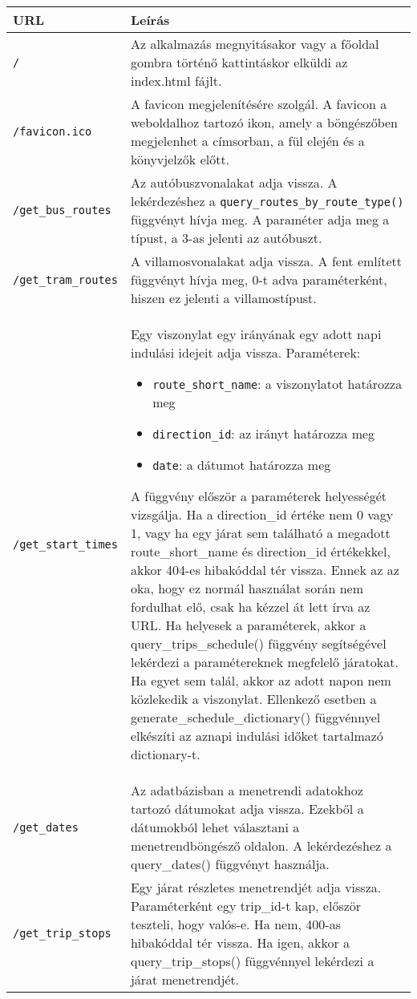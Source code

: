 \begin{longtable}{|p{4.5cm}|p{9cm}|}
\hline
\textbf{URL} & \textbf{Leírás} \\
\hline
\texttt{/} &
Az alkalmazás megnyitásakor vagy a főoldal gombra történő kattintáskor elküldi az index.html fájlt. \\
\hline
\texttt{/favicon.ico} &
A favicon megjelenítésére szolgál. A favicon a weboldalhoz tartozó ikon, amely a böngészőben megjelenhet a címsorban, a fül elején és a könyvjelzők előtt. \\
\hline
\texttt{/get\_bus\_routes} &
Az autóbuszvonalakat adja vissza. A lekérdezéshez a \texttt{query\_routes\_by\_route\_type()} függvényt hívja meg. A paraméter adja meg a típust, a 3-as jelenti az autóbuszt. \\
\hline
\texttt{/get\_tram\_routes} &
A villamosvonalakat adja vissza. A fent említett függvényt hívja meg, 0-t adva paraméterként, hiszen ez jelenti a villamostípust. \\
\hline
\texttt{/get\_start\_times} &
Egy viszonylat egy irányának egy adott napi indulási idejeit adja vissza.
Paraméterek:
\begin{itemize}
\item \texttt{route\_short\_name}: a viszonylatot határozza meg
\item \texttt{direction\_id}: az irányt határozza meg
\item \texttt{date}: a dátumot határozza meg
\end{itemize}
A függvény először a paraméterek helyességét vizsgálja. Ha a direction\_id értéke nem 0 vagy 1, vagy ha egy járat sem található a megadott route\_short\_name és direction\_id értékekkel, akkor 404-es hibakóddal tér vissza. Ennek az az oka, hogy ez normál használat során nem fordulhat elő, csak ha kézzel át lett írva az URL.
Ha helyesek a paraméterek, akkor a query\_trips\_schedule() függvény segítségével lekérdezi a paramétereknek megfelelő járatokat. Ha egyet sem talál, akkor az adott napon nem közlekedik a viszonylat. Ellenkező esetben a generate\_schedule\_dictionary()  függvénnyel elkészíti az aznapi indulási időket tartalmazó dictionary-t. \\
\hline
\texttt{/get\_dates} &
Az adatbázisban a menetrendi adatokhoz tartozó dátumokat adja vissza. Ezekből a dátumokból lehet választani a menetrendböngésző oldalon. A lekérdezéshez a query\_dates() függvényt használja.  \\
\hline
\texttt{/get\_trip\_stops} &
Egy járat részletes menetrendjét adja vissza. Paraméterként egy trip\_id-t kap, először teszteli, hogy valós-e. Ha nem, 400-as hibakóddal tér vissza. Ha igen, akkor a query\_trip\_stops() függvénnyel lekérdezi a járat menetrendjét.  \\

\end{longtable}
